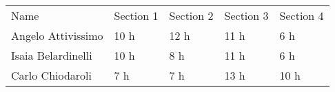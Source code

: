 
\begin{center}
    \begin{tabu}{|X[1.5]|X|X|X|X|} \hline \everyrow{\hline}
        Name & Section 1 & Section 2 & Section 3 & Section 4 \\ 
        Angelo Attivissimo & 10 h & 12 h & 11 h & 6 h \\
        Isaia Belardinelli & 10 h & 8 h & 11 h & 6 h \\
        Carlo Chiodaroli & 7 h & 7 h & 13 h & 10 h \\ 
    \end{tabu}
\end{center}